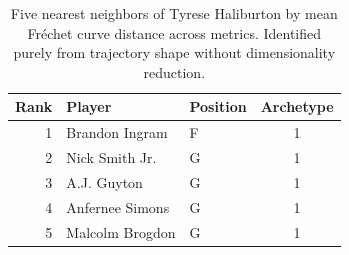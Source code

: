 \begin{table}[htbp]
  \centering\small
  \begin{tabular}{rllc}
    \toprule
    Rank & Player & Position & Archetype \\
    \midrule
    1 & Brandon Ingram & F & 1 \\
    2 & Nick Smith Jr. & G & 1 \\
    3 & A.J. Guyton & G & 1 \\
    4 & Anfernee Simons & G & 1 \\
    5 & Malcolm Brogdon & G & 1 \\
    \bottomrule
  \end{tabular}
  \caption{Five nearest neighbors of Tyrese Haliburton by mean Fr\'{e}chet curve distance across metrics. Identified purely from trajectory shape without dimensionality reduction.}
  \label{tab:Tyrese_Haliburton_frechet_curve_neighbors}
\end{table}

